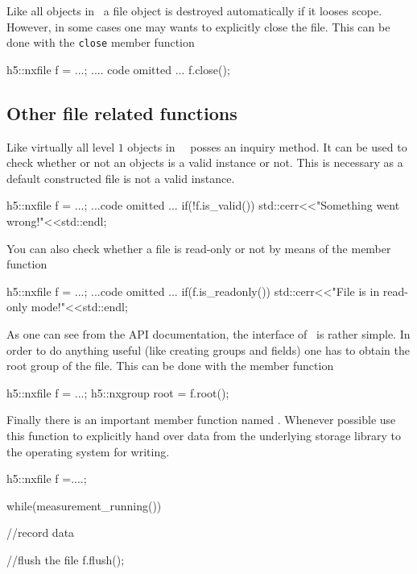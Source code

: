 Like all objects in \libpniio\ a file object is destroyed automatically if it
looses scope.  However, in some cases one may wants to explicitly close the
file. This can be done with the \texttt{close} member function
\begin{cppcode}
h5::nxfile f = ...;
.... code omitted ...
f.close();
\end{cppcode}

\subsection{Other file related functions}

Like virtually all level $1$ objects in \libpniio\ \nxfile\ posses an
 inquiry method. It can be used to check whether or not an
objects is a valid instance or not. This is necessary as a default constructed
file is not a valid instance. 
\begin{cppcode}
h5::nxfile f = ...;
...code omitted ...
if(!f.is_valid())
    std::cerr<<"Something went wrong!"<<std::endl;
\end{cppcode}
You can also check whether a file is read-only or not by means of the 
 member function 
\begin{cppcode}
h5::nxfile f = ...;
...code omitted ...
if(f.is_readonly())
    std::cerr<<"File is in read-only mode!"<<std::endl;
\end{cppcode}
As one can see from the API documentation, the interface of \nxfile\ is rather
simple. In order to do anything useful (like creating groups and fields) one 
has to obtain the root group of the file. This can be done with the 
 member function
\begin{cppcode}
h5::nxfile f = ...;
h5::nxgroup root = f.root();
\end{cppcode}
Finally there is an important member function named . Whenever
possible use this function to explicitly hand over data from the underlying
storage library to the operating system for writing.
\begin{cppcode}
h5::nxfile f =....;

while(measurement_running())
{
    //record data

    //flush the file
    f.flush();
}
\end{cppcode}

